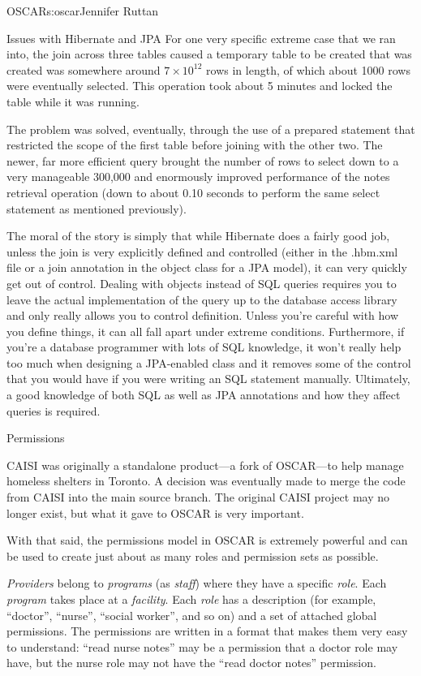 \begin{aosachapter}{OSCAR}{s:oscar}{Jennifer Ruttan}
\begin{aosasect1}{Issues with Hibernate and JPA}
For one very specific extreme case that we ran into, the join across
three tables caused a temporary table to be created that was created
was somewhere around $7{\times}10^{12}$ rows in length, of which about
1000 rows were eventually selected. This operation took about 5
minutes and locked the  table while it was running.

The problem was solved, eventually, through the use of a prepared
statement that restricted the scope of the first table before joining
with the other two. The newer, far more efficient query brought the
number of rows to select down to a very manageable 300,000 and
enormously improved performance of the notes retrieval operation (down
to about 0.10 seconds to perform the same select statement as
mentioned previously).

The moral of the story is simply that while Hibernate does a fairly
good job, unless the join is very explicitly defined and controlled
(either in the .hbm.xml file or a join annotation in the object class
for a JPA model), it can very quickly get out of control. Dealing with
objects instead of SQL queries requires you to leave the actual
implementation of the query up to the database access library and only
really allows you to control definition. Unless you're careful with
how you define things, it can all fall apart under extreme
conditions. Furthermore, if you're a database programmer with lots of
SQL knowledge, it won't really help too much when designing a
JPA-enabled class and it removes some of the control that you would
have if you were writing an SQL statement manually. Ultimately, a good
knowledge of both SQL as well as JPA annotations and how they affect
queries is required.

\end{aosasect1}

\begin{aosasect1}{Permissions}

CAISI was originally a standalone product---a fork of OSCAR---to help
manage homeless shelters in Toronto. A decision was eventually made to
merge the code from CAISI into the main source branch. The original
CAISI project may no longer exist, but what it gave to OSCAR is very
important.

With that said, the permissions model in OSCAR is extremely powerful
and can be used to create just about as many roles and permission sets
as possible.

\emph{Providers} belong to \emph{programs} (as \emph{staff}) where
they have a specific \emph{role}. Each \emph{program} takes place at
a \emph{facility}. Each \emph{role} has a description (for example,
``doctor'', ``nurse'', ``social worker'', and so on) and a set of
attached global permissions. The permissions are written in a format
that makes them very easy to understand: ``read nurse notes'' may be a
permission that a doctor role may have, but the nurse role may not
have the ``read doctor notes'' permission.


\end{aosasect1}
\end{aosachapter}
